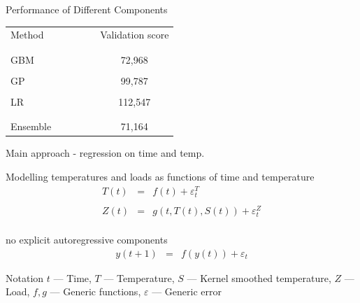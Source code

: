 \begin{frame}{Performance of Different Components}
  \begin{center}
    \begin{tabular}{lcc|ccc}
      Method &&&&& Validation score\\\\
      \hline\\
      GBM &&&&& 72,968 \\\\
      GP &&&&& 99,787 \\\\
      LR &&&&& 112,547 \\\\
      \hline\\
      Ensemble &&&&& 71,164
    \end{tabular}
  \end{center}
\end{frame}


\begin{frame}{Main approach - regression on time and temp.}
  \begin{block}{Modelling temperatures and loads as functions of time and temperature}
    \begin{eqnarray*}
      T(t) & = & f(t) + \varepsilon^T_t \\
      \\
      Z(t) & = & g(t, T(t), S(t)) + \varepsilon^Z_t \\
    \end{eqnarray*}
  \end{block}
  \begin{block}{\ie no explicit autoregressive components \eg}
    \begin{eqnarray*}
      y(t+1) & = & f(y(t)) + \varepsilon_t
    \end{eqnarray*}
  \end{block}
  \begin{block}{Notation}
    $t$ --- Time, $T$ --- Temperature, $S$ --- Kernel smoothed temperature, $Z$ --- Load, $f,g$ --- Generic functions, $\varepsilon$ --- Generic error
  \end{block}
\end{frame}

